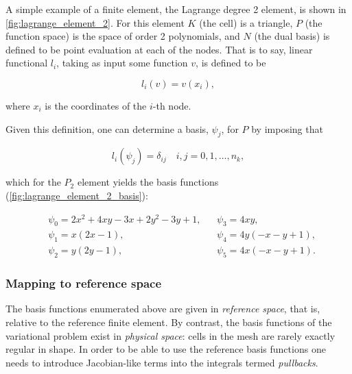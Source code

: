 \documentclass[thesis]{subfiles}
\begin{document}
A simple example of a finite element, the Lagrange degree 2 element, is shown in \cref{fig:lagrange_element_2}.
For this element $K$ (the cell) is a triangle, $P$ (the function space) is the space of order 2 polynomials, and $N$ (the dual basis) is defined to be point evaluation at each of the nodes.
That is to say, linear functional $l_i$, taking as input some function $v$, is defined to be

\begin{equation*}
  l_i(v) = v(x_i),
\end{equation*}

\noindent
where $x_i$ is the coordinates of the $i$-th node.

Given this definition, one can determine a basis, $\psi_j$, for $P$ by imposing that


\begin{equation*}
  l_i(\psi_j) = \delta_{ij} \quad i, j = 0, 1, \dots, n_k,
\end{equation*}

\noindent
which for the $P_2$ element yields the basis functions (\cref{fig:lagrange_element_2_basis}):

\begin{align}
  &\psi_0 = 2x^2 + 4xy - 3x + 2y^2-3y+1,
  &
  &\psi_3 = 4xy, \\
  &\psi_1 = x(2x-1),
  &
  &\psi_4 = 4y(-x-y+1), \\
  &\psi_2 = y(2y-1),
  &
  &\psi_5 = 4x(-x-y+1).
  \label{eq:basis_functions}
\end{align}

\subsubsection{Mapping to reference space}


The basis functions enumerated above are given in \textit{reference space}, that is, relative to the reference finite element.
By contrast, the basis functions of the variational problem exist in \textit{physical space}: cells in the mesh are rarely exactly regular in shape.
In order to be able to use the reference basis functions one needs to introduce Jacobian-like terms into the integrals termed \textit{pullbacks}.
\end{document}
